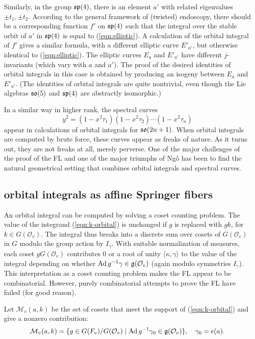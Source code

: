 \documentclass[brochure,english,12pt]{bourbaki}
\def\op#1{{\operatorname{#1}}}
\def\so{\frak{so}}
\def\sp{\frak{sp}}
\def\g{\frak{g}}
\def\M{{\mathcal M}}
\def\O{{\mathcal O}}
\begin{document}
Similarly, in the group $\sp(4)$, there is an element ${{a'}}$ with
related eigenvalues $\pm t_1,\pm t_2$.  According to the general
framework of (twisted) endoscopy, there should be a corresponding
function $f'$ on $\sp(4)$ such that the integral over the stable orbit
of ${{a'}}$ in $\sp(4)$ is equal to (\ref{eqn:elliptic}).  A
calculation of the orbital integral of $f'$ gives a similar formula,
with a different elliptic curve $E'_{{a'}}$, but otherwise identical to
(\ref{eqn:elliptic}).  The elliptic curves $E_a$ and $E'_{{a'}}$ have
different $j$-invariants (which vary with $a$ and ${{a'}}$).  The proof
of the desired identities of orbital integrals in this case is
obtained by producing an isogeny between $E_a$ and $E'_{{a'}}$.  (The
identities of orbital integrals are quite nontrivial, even though the
Lie algebras $\so(5)$ and $\sp(4)$ are abstractly isomorphic.)

In a similar way in higher rank,  the spectral curves
\[
y^2 = (1-x^2 \tau_1)(1-x^2 \tau_2)\cdots (1-x^2 \tau_n)
\]
appear  in calculations of orbital integrals for
$\so(2n+1)$.  When orbital integrals are computed by brute force,
these curves appear as freaks of nature.  As it turns
out, they are not freaks at all, merely perverse.  One of the major
challenges of the proof of the FL and one of the major
triumphs of Ng\^o has been to find the natural geometrical setting that combines
orbital integrals and spectral curves.


\subsection{orbital integrals as affine Springer fibers}\label{sec:coset}

An orbital integral can be computed by solving a coset counting
problem.  The value of the integrand (\ref{eqn:k-orbital}) is unchanged if $g$ is replaced
with $g k$, for $k\in G(\O_v)$.  The integral thus breaks into a
discrete sum over cosets of $G(\O_v)$ in $G$ modulo the group action
by $I_\gamma$.  With suitable normalization of measures, each coset
$g G(\O_v)$ contributes $0$ or a root of unity $\langle\kappa,\gamma\rangle$
to the value of the integral depending on whether $\op{Ad}\,g^{-1}\gamma \in
\g(\O_v)$ (again modulo symmetries $I_\gamma$).  This interpretation as a
coset counting problem makes the FL appear to be combinatorial.
However, purely combinatorial attempts to prove the FL have failed (for good reason).

Let $\M_v(a,k)$ be the set of cosets that meet the support of (\ref{eqn:k-orbital})
 and give a nonzero contribution:
\[
\M_v(a,k) = \{g\in G(F_v)/G(\O_v) \mid \op{Ad}\,g^{-1} \gamma_0 \in \g(\O_v)\}, 
\quad \gamma_0 = \epsilon(a).
\]
\end{document}
